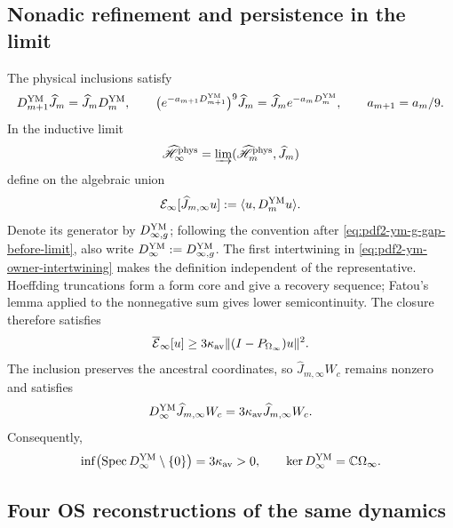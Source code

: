 \subsection{Nonadic refinement and persistence in the limit}

The physical inclusions satisfy
\begin{equation}\label{eq:pdf2-ym-owner-intertwining}
 D_{m+1}^{\rm YM}\widehat J_m
 =\widehat J_mD_m^{\rm YM},\qquad
 \bigl(e^{-a_{m+1}D_{m+1}^{\rm YM}}\bigr)^9\widehat J_m
 =\widehat J_me^{-a_mD_m^{\rm YM}},\qquad a_{m+1}=a_m/9.
\end{equation}
In the inductive limit
\begin{equation}\label{eq:pdf2-ym-owner-inductive-limit}
 \widehat{\mathscr H}_\infty^{\rm phys}
 =\varinjlim(\widehat{\mathscr H}_m^{\rm phys},\widehat J_m)
\end{equation}
define on the algebraic union
\begin{equation}\label{eq:pdf2-ym-owner-limit-form}
 \mathcal E_\infty[\widehat J_{m,\infty}u]
 :=\langle u,D_m^{\rm YM}u\rangle.
\end{equation}
Denote its generator by
$D_{\infty,g}^{\rm YM}$; following the convention after
\eqref{eq:pdf2-ym-g-gap-before-limit}, also write
$D_\infty^{\rm YM}:=D_{\infty,g}^{\rm YM}$.
The first intertwining in \eqref{eq:pdf2-ym-owner-intertwining} makes the
definition independent of the representative. Hoeffding truncations form
a form core and give a recovery sequence; Fatou's lemma applied to the nonnegative sum
gives lower semicontinuity. The closure therefore satisfies
\begin{equation}\label{eq:pdf2-ym-owner-limit-gap}
 \overline{\mathcal E}_\infty[u]
 \ge3\kappa_{\rm av}\|(I-P_{\Omega_\infty})u\|^2.
\end{equation}
The inclusion preserves the ancestral coordinates, so
$\widehat J_{m,\infty}W_c$ remains nonzero and satisfies
\begin{equation}\label{eq:pdf2-ym-owner-limit-witness}
 D_\infty^{\rm YM}\widehat J_{m,\infty}W_c
 =3\kappa_{\rm av}\widehat J_{m,\infty}W_c.
\end{equation}
Consequently,
\begin{equation}\label{eq:pdf2-ym-owner-exact-gap}
 \inf\bigl(\operatorname{Spec}D_\infty^{\rm YM}\setminus\{0\}\bigr)
 =3\kappa_{\rm av}>0,
 \qquad \ker D_\infty^{\rm YM}=\mathbb C\Omega_\infty.
\end{equation}

\subsection{Four OS reconstructions of the same dynamics}

